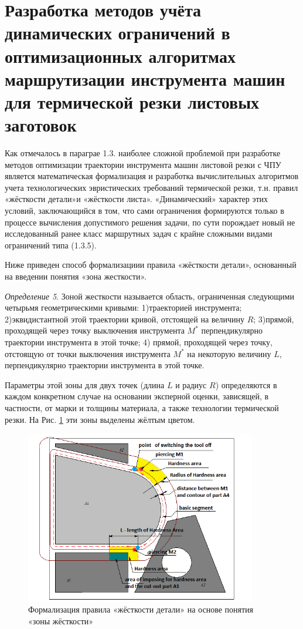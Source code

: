 \documentclass[12pt,twoside]{report}
\begin{document}
\section{Разработка методов учёта динамических ограничений
  в оптимизационных алгоритмах маршрутизации инструмента машин для термической резки листовых заготовок}

Как отмечалось в параграе 1.3.
наиболее сложной проблемой при разработке методов оптимизации
траектории инструмента машин листовой резки с ЧПУ
является математическая формализация и
разработка вычислительных алгоритмов учета
технологических эвристических требований термической резки,
т.н. правил «жёсткости детали»и «жёсткости листа».
«Динамический» характер этих условий, заключающийся в том,
что сами ограничения формируются только в процессе вычисления
допустимого решения задачи, по сути порождает
новый не исследованный ранее класс маршрутных задач
с крайне сложными видами ограничений типа (1.3.5).

Ниже приведен способ формализациии правила «жёсткости детали»,
основанный на введении понятия «зона жесткости».

{\it Определение 5}.
Зоной жесткости называется область,
ограниченная следующими четырьмя геометрическими кривыми:
1)траекторией инструмента;
2)эквидистантной этой траектории кривой, отстоящей на величину $R$;
3)прямой, проходящей через точку выключения инструмента $M^*$
перпендикулярно траектории инструмента в этой точке;
4) прямой, проходящей через точку,
отстоящую от точки выключения инструмента $M^*$ на некоторую величину $L$,
перпендикулярно траектории инструмента в этой точке.

Параметры этой зоны для двух точек
(длина $L$ и радиус $R$)
определяются в каждом конкретном случае
на основании эксперной оценки,
зависящей, в частности, от марки и толщины материала,
а также технологии термической резки.
На Рис. \ref{hardness-area}
эти зоны выделены жёлтым цветом.

\begin{figure}
 \begin{center}
  \includegraphics[width=0.9\textwidth]{hardness-area.png}
  \caption{Формализация правила «жёсткости детали» на основе понятия «зоны жёсткости»}
  \label{hardness-area}
  \end{center}
\end{figure}
\end{document}
